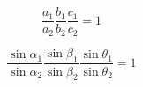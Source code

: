 \newpage
\section{
 }

\begin{figure}[h!]
	\centering
\end{figure}

\begin{equation}
	\frac{a_1}{a_2} \frac{b_1}{b_2} \frac{c_1}{c_2} = 1
\end{equation}

\begin{figure}[h!]
	\centering
\end{figure}

\begin{equation}
	\frac{\sin\alpha_1}{\sin\alpha_2} \frac{\sin\beta_1}{\sin\beta_2} \frac{\sin\theta_1}{\sin\theta_2} = 1
\end{equation}
